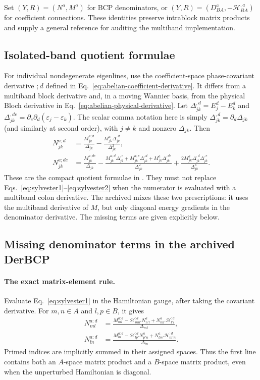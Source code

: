 \documentclass[prx,amsmath,amssymb,superscriptaddress,longbibliography]{revtex4-2}
\newcommand{\code}[1]{\texttt{\detokenize{#1}}}
\begin{document}
Set $(Y,R)=(N^a,M^a)$ for BCP denominators, or
$(Y,R)=(D^a_{BA},-\mathcal H_{BA}^{,a})$ for coefficient connections.
These identities preserve intrablock matrix products and supply a general
reference for auditing the multiband implementation.

\subsection{Isolated-band quotient formulae}
For individual nondegenerate eigenlines, use the coefficient-space
phase-covariant derivative $;d$ defined in
Eq.~\eqref{eq:abelian-coefficient-derivative}.
It differs from a multiband block derivative and, in a moving Wannier basis,
from the physical Bloch derivative in Eq.~\eqref{eq:abelian-physical-derivative}.
Let $\Delta_{jk}^{,d}=E_j^d-E_k^d$ and
$\Delta_{jk}^{,de}=\partial_e\partial_d(\varepsilon_j-\varepsilon_k)$.
The scalar comma notation here is simply
$\Delta_{jk}^{,d}=\partial_d\Delta_{jk}$ (and similarly at second order),
with $j\ne k$ and nonzero $\Delta_{jk}$.
Then
\begin{align}
 N_{jk}^{a;d}
 &=\frac{M_{jk}^{a;d}}{\Delta_{jk}}
   -\frac{M_{jk}^{a}\Delta_{jk}^{,d}}{\Delta_{jk}^2},\label{eq:Nfirst}\\
 N_{jk}^{a;de}
 &=\frac{M_{jk}^{a;de}}{\Delta_{jk}}
   -\frac{M_{jk}^{a;d}\Delta_{jk}^{,e}+M_{jk}^{a;e}\Delta_{jk}^{,d}
           +M_{jk}^a\Delta_{jk}^{,de}}{\Delta_{jk}^2}
   +\frac{2M_{jk}^a\Delta_{jk}^{,d}\Delta_{jk}^{,e}}{\Delta_{jk}^3}.
 \label{eq:Nsecond}
\end{align}
These are the compact quotient formulae in \code{Wannier.tex}.
They must not replace Eqs.~\eqref{eq:sylvester1}--\eqref{eq:sylvester2}
when the numerator is evaluated with a multiband colon derivative.
The archived \code{DerBCP} mixes these two prescriptions: it uses the
multiband derivative of $M$, but only diagonal energy gradients in the
denominator derivative. The missing terms are given explicitly below.

\subsection{Missing denominator terms in the archived DerBCP}
\label{sec:bcp-missing-denominator}
\paragraph{The exact matrix-element rule.}
Evaluate Eq.~\eqref{eq:sylvester1} in the Hamiltonian gauge, after taking
the covariant derivative. For $m,n\in A$ and $l,p\in B$, it gives
\begin{align}
 N_{ml}^{a:d}
 &=\frac{M_{ml}^{a:d}
   -\mathcal H_{mn'}^{:d}N_{n'l}^a
   +N_{ml'}^a\mathcal H_{l'l}^{:d}}{\Delta_{ml}},\nonumber\\
 N_{ln}^{a:d}
 &=\frac{M_{ln}^{a:d}
   -\mathcal H_{lp'}^{:d}N_{p'n}^a
   +N_{lm'}^a\mathcal H_{m'n}^{:d}}{\Delta_{ln}}.
 \label{eq:Nfirst-full-components}
\end{align}
Primed indices are implicitly summed in their assigned spaces. Thus the
first line contains both an $A$-space matrix product and a $B$-space matrix
product, even when the unperturbed Hamiltonian is diagonal.
\end{document}
